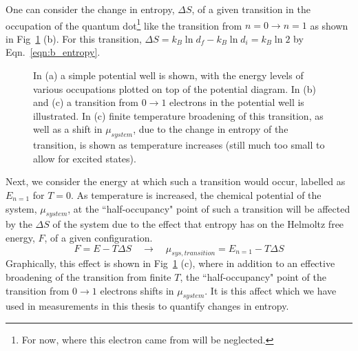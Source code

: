 One can consider the change in entropy, $\Delta S$, of a given transition in the occupation of the quantum dot\footnote{For now, where this electron came from will be neglected.} like the transition from $n = 0 \to n = 1$ as shown in Fig~\ref{fig:potential_wells} (b). For this transition, $\Delta S = k_B \ln d_f - k_B \ln d_i = k_B \ln 2$ by Eqn.~\ref{eqn:b_entropy}.
\begin{figure}[h]
\centering
{}
\caption{In (a) a simple potential well is shown, with the energy levels of various occupations plotted on top of the potential diagram. In (b) and (c) a transition from $0 \to 1$ electrons in the potential well is illustrated. In (c) finite temperature broadening of this transition, as well as a shift in $\mu_{system}$, due to the change in entropy of the transition, is shown as temperature increases (still much too small to allow for excited states). }
\label{fig:potential_wells}       %
\end{figure}

Next, we consider the energy at which such a transition would occur, labelled as $E_{n=1}$ for $T=0$. As temperature is increased, the chemical potential of the system, $\mu_{system}$, at the ``half-occupancy" point of such a transition will be affected by the $\Delta S$ of the system due to the effect that entropy has on the Helmoltz free energy, $F$, of a given configuration.
\begin{equation}
	F = E - T \Delta S \quad \to \quad \mu_{sys, transition}  = E_{n=1} - T \Delta S
\end{equation}
Graphically, this effect is shown in Fig~\ref{fig:potential_wells} (c), where in addition to an effective broadening of the transition from finite $T$, the ``half-occupancy" point of the transition from $0 \to 1$ electrons shifts in $\mu_{system}$. It is this affect which we have used in measurements in this thesis to quantify changes in entropy.

